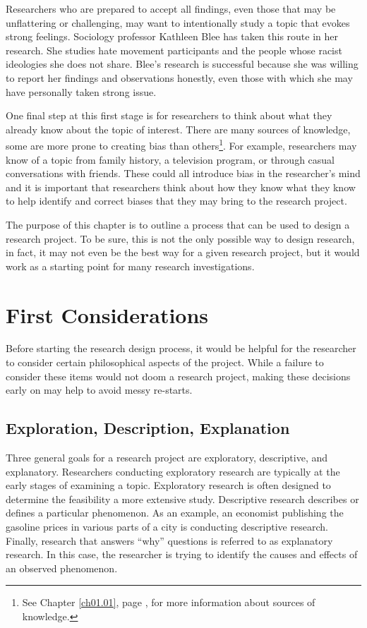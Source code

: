 Researchers who are prepared to accept all findings, even those that may be unflattering or challenging, may want to intentionally study a topic that evokes strong feelings. Sociology professor Kathleen Blee\cite{blee2005racial} has taken this route in her research. She studies hate movement participants and the people whose racist ideologies she does not share. Blee's research is successful because she was willing to report her findings and observations honestly, even those with which she may have personally taken strong issue.

One final step at this first stage is for researchers to think about what they already know about the topic of interest. There are many sources of knowledge, some are more prone to creating bias than others\footnote{See Chapter \ref{ch01.01}, page \pageref{ch01.01}, for more information about sources of knowledge.}. For example, researchers may know of a topic from family history, a television program, or through casual conversations with friends. These could all introduce bias in the researcher's mind and it is important that researchers think about how they know what they know to help identify and correct biases that they may bring to the research project.

The purpose of this chapter is to outline a process that can be used to design a research project. To be sure, this is not the only possible way to design research, in fact, it may not even be the best way for a given research project, but it would work as a starting point for many research investigations.

\section{First Considerations}

Before starting the research design process, it would be helpful for the researcher to consider certain philosophical aspects of the project. While a failure to consider these items would not doom a research project, making these decisions early on may help to avoid messy re-starts. 

\subsection{Exploration, Description, Explanation}

Three general goals for a research project are exploratory, descriptive, and explanatory. Researchers conducting exploratory research are typically at the early stages of examining a topic. Exploratory research is often designed to determine the feasibility a more extensive study. Descriptive research describes or defines a particular phenomenon. As an example, an economist publishing the gasoline prices in various parts of a city is conducting descriptive research. Finally, research that answers ``why'' questions is referred to as explanatory research. In this case, the researcher is trying to identify the causes and effects of an observed phenomenon.

